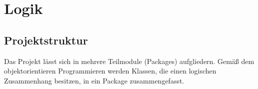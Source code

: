 \chapter{Logik}

\section{Projektstruktur}

Das Projekt lässt sich in mehrere Teilmodule (Packages) aufgliedern. Gemäß dem objektorientieren Programmieren werden Klassen, die einen logischen Zusammenhang besitzen, in ein Package zusammengefasst.
